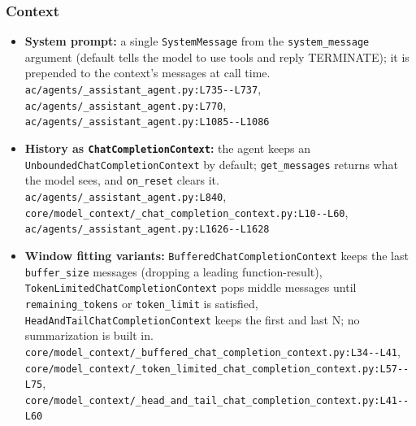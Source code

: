 \subsubsection*{Context}
\begin{itemize}
\item \textbf{System prompt:} a single \texttt{SystemMessage} from the \texttt{system\_\allowbreak{}message} argument (default tells the model to use tools and reply TERMINATE); it is prepended to the context's messages at call time. \texttt{ac/\allowbreak{}agents/\allowbreak{}\_\allowbreak{}assistant\_\allowbreak{}agent.\allowbreak{}py:\allowbreak{}L735-\allowbreak{}-\allowbreak{}L737}, \texttt{ac/\allowbreak{}agents/\allowbreak{}\_\allowbreak{}assistant\_\allowbreak{}agent.\allowbreak{}py:\allowbreak{}L770}, \texttt{ac/\allowbreak{}agents/\allowbreak{}\_\allowbreak{}assistant\_\allowbreak{}agent.\allowbreak{}py:\allowbreak{}L1085-\allowbreak{}-\allowbreak{}L1086}
\item \textbf{History as \texttt{ChatCompletionContext}:} the agent keeps an \texttt{UnboundedChatCompletionContext} by default; \texttt{get\_\allowbreak{}messages} returns what the model sees, and \texttt{on\_\allowbreak{}reset} clears it. \texttt{ac/\allowbreak{}agents/\allowbreak{}\_\allowbreak{}assistant\_\allowbreak{}agent.\allowbreak{}py:\allowbreak{}L840}, \texttt{core/\allowbreak{}model\_\allowbreak{}context/\allowbreak{}\_\allowbreak{}chat\_\allowbreak{}completion\_\allowbreak{}context.\allowbreak{}py:\allowbreak{}L10-\allowbreak{}-\allowbreak{}L60}, \texttt{ac/\allowbreak{}agents/\allowbreak{}\_\allowbreak{}assistant\_\allowbreak{}agent.\allowbreak{}py:\allowbreak{}L1626-\allowbreak{}-\allowbreak{}L1628}
\item \textbf{Window fitting variants:} \texttt{BufferedChatCompletionContext} keeps the last \texttt{buffer\_\allowbreak{}size} messages (dropping a leading function-result), \texttt{TokenLimitedChatCompletionContext} pops middle messages until \texttt{remaining\_\allowbreak{}tokens} or \texttt{token\_\allowbreak{}limit} is satisfied, \texttt{HeadAndTailChatCompletionContext} keeps the first and last N; no summarization is built in. \texttt{core/\allowbreak{}model\_\allowbreak{}context/\allowbreak{}\_\allowbreak{}buffered\_\allowbreak{}chat\_\allowbreak{}completion\_\allowbreak{}context.\allowbreak{}py:\allowbreak{}L34-\allowbreak{}-\allowbreak{}L41}, \texttt{core/\allowbreak{}model\_\allowbreak{}context/\allowbreak{}\_\allowbreak{}token\_\allowbreak{}limited\_\allowbreak{}chat\_\allowbreak{}completion\_\allowbreak{}context.\allowbreak{}py:\allowbreak{}L57-\allowbreak{}-\allowbreak{}L75}, \texttt{core/\allowbreak{}model\_\allowbreak{}context/\allowbreak{}\_\allowbreak{}head\_\allowbreak{}and\_\allowbreak{}tail\_\allowbreak{}chat\_\allowbreak{}completion\_\allowbreak{}context.\allowbreak{}py:\allowbreak{}L41-\allowbreak{}-\allowbreak{}L60}

\end{itemize}
